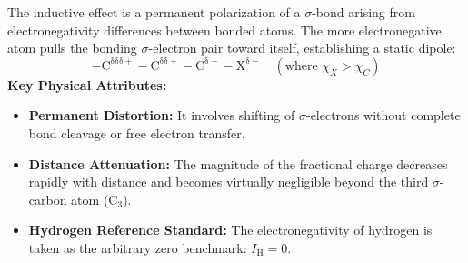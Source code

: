 \documentclass[10pt,a4paper]{article}
\begin{document}
\begin{conceptbox}
The inductive effect is a permanent polarization of a $\sigma$-bond arising from electronegativity differences between bonded atoms. The more electronegative atom pulls the bonding $\sigma$-electron pair toward itself, establishing a static dipole:
\begin{equation}
  \mathrm{-C^{\delta\delta\delta+} - C^{\delta\delta+} - C^{\delta+} - X^{\delta-}} \quad (\text{where } \chi_X > \chi_C)
\end{equation}
\textbf{Key Physical Attributes:}
\begin{itemize}
  \item \textbf{Permanent Distortion:} It involves shifting of $\sigma$-electrons without complete bond cleavage or free electron transfer.
  \item \textbf{Distance Attenuation:} The magnitude of the fractional charge decreases rapidly with distance and becomes virtually negligible beyond the third $\sigma$-carbon atom ($\mathrm{C}_3$).
  \item \textbf{Hydrogen Reference Standard:} The electronegativity of hydrogen is taken as the arbitrary zero benchmark: $I_{\mathrm{H}} = 0$.
\end{itemize}
\end{conceptbox}
\end{document}
